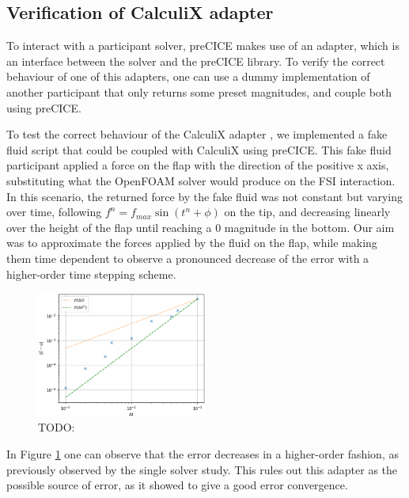 \documentclass[
  english,        %
  font=times,     %
  onecolumn,      %
]{tumarticle}
\begin{document}
\subsection{Verification of CalculiX adapter}
To interact with a participant solver, preCICE makes use of an adapter, which is an interface between the solver and the preCICE library. To verify the correct behaviour of one of this adapters, one can use a dummy implementation of another participant that only returns some preset magnitudes, and couple both using preCICE.

To test the correct behaviour of the CalculiX adapter \cite{yau2016conjugate}, we implemented a fake fluid script that could be coupled with CalculiX using preCICE. This fake fluid \cite{pullrequestfake-fluid} participant applied a force on the flap with the direction of the positive x axis, substituting what the OpenFOAM solver would produce on the FSI interaction. In this scenario, the returned force by the fake fluid was not constant but varying over time, following $f^n = f_{max} \sin(t^n + \phi)$ on the tip, and decreasing linearly over the height of the flap until reaching a 0 magnitude in the bottom. Our aim was to approximate the forces applied by the fluid on the flap, while making them time dependent to observe a pronounced decrease of the error with a higher-order time stepping scheme.

\begin{figure}[!ht]
    \centering
    \includegraphics[width=0.5\textwidth]{resources/fake_fluid.png}
    \caption{TODO: }
    \label{fig:fake-fluid}
\end{figure}

In Figure \ref{fig:fake-fluid} one can observe that the error decreases in a higher-order fashion, as previously observed by the single solver study. This rules out this adapter as the possible source of error, as it showed to give a good error convergence.
\end{document}
